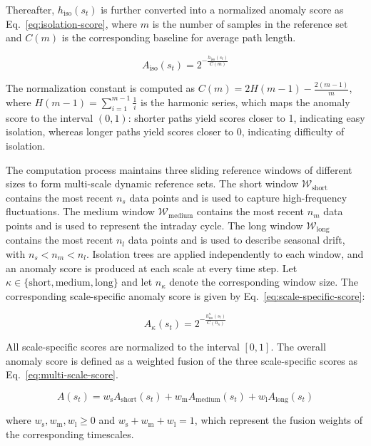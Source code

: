 \documentclass[preprint,12pt]{elsarticle}
\begin{document}
Thereafter, \(h_{\mathrm{iso}}(s_t)\) is further converted into a normalized anomaly score as Eq.~\eqref{eq:isolation-score}, where \(m\) is the number of samples in the reference set and \(C(m)\) is the corresponding baseline for average path length.

\[A_{\mathrm{iso}}(s_t) = 2^{-\frac{h_{\mathrm{iso}}(s_t)}{C(m)}} \tag{6}\label{eq:isolation-score}\]

The normalization constant is computed as \(C(m) = 2H(m-1) - \frac{2(m-1)}{m}\), where \(H(m-1)=\sum\limits_{i=1}^{m-1}\frac{1}{i}\) is the harmonic series, which maps the anomaly score to the interval \((0,1)\): shorter paths yield scores closer to 1, indicating easy isolation, whereas longer paths yield scores closer to 0, indicating difficulty of isolation.

The computation process maintains three sliding reference windows of different sizes to form multi-scale dynamic reference sets. The short window \(\mathcal{W}_{\mathrm{short}}\) contains the most recent \(n_s\) data points and is used to capture high-frequency fluctuations. The medium window \(\mathcal{W}_{\mathrm{medium}}\) contains the most recent \(n_m\) data points and is used to represent the intraday cycle. The long window \(\mathcal{W}_{\mathrm{long}}\) contains the most recent \(n_l\) data points and is used to describe seasonal drift, with \(n_s < n_m < n_l\). Isolation trees are applied independently to each window, and an anomaly score is produced at each scale at every time step. Let \(\kappa\in\{\mathrm{short},\mathrm{medium},\mathrm{long}\}\) and let \(n_\kappa\) denote the corresponding window size. The corresponding scale-specific anomaly score is given by Eq.~\eqref{eq:scale-specific-score}:

\[A_{\kappa}(s_t)=2^{-\frac{h_{\mathrm{iso}}^{\kappa}(s_t)}{C(n_{\kappa})}} \tag{7}\label{eq:scale-specific-score}\]

All scale-specific scores are normalized to the interval \([0,1]\). The overall anomaly score is defined as a weighted fusion of the three scale-specific scores as Eq.~\eqref{eq:multi-scale-score}.

\[A(s_t)=w_{\mathrm{s}}A_{\mathrm{short}}(s_t)+w_{\mathrm{m}}A_{\mathrm{medium}}(s_t)+w_{\mathrm{l}}A_{\mathrm{long}}(s_t) \tag{8}\label{eq:multi-scale-score}\]

\noindent where \(w_{\mathrm{s}}, w_{\mathrm{m}}, w_{\mathrm{l}} \ge 0\) and \(w_{\mathrm{s}}+w_{\mathrm{m}}+w_{\mathrm{l}}=1\), which represent the fusion weights of the corresponding timescales.
\end{document}
